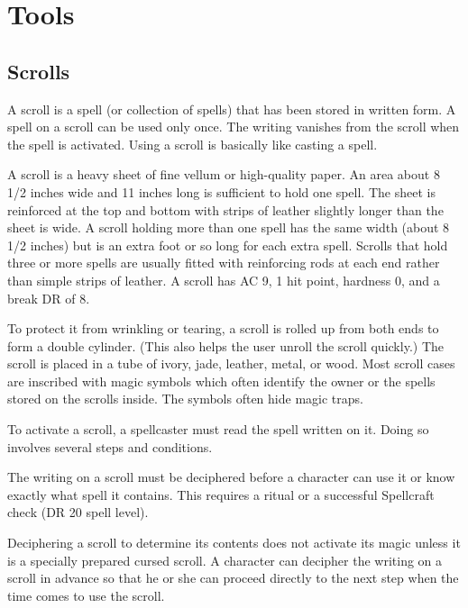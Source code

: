 \section{Tools}

    \subsection{Scrolls}
        A scroll is a spell (or collection of spells) that has been stored in written form.
        A spell on a scroll can be used only once.
        The writing vanishes from the scroll when the spell is activated.
        Using a scroll is basically like casting a spell.

         A scroll is a heavy sheet of fine vellum or high-quality paper.
        An area about 8 1/2 inches wide and 11 inches long is sufficient to hold one spell.
        The sheet is reinforced at the top and bottom with strips of leather slightly longer than the sheet is wide.
        A scroll holding more than one spell has the same width (about 8 1/2 inches) but is an extra foot or so long for each extra spell.
        Scrolls that hold three or more spells are usually fitted with reinforcing rods at each end rather than simple strips of leather.
        A scroll has AC 9, 1 hit point, hardness 0, and a break DR of 8.

        To protect it from wrinkling or tearing, a scroll is rolled up from both ends to form a double cylinder.
        (This also helps the user unroll the scroll quickly.) The scroll is placed in a tube of ivory, jade, leather, metal, or wood.
        Most scroll cases are inscribed with magic symbols which often identify the owner or the spells stored on the scrolls inside.
        The symbols often hide magic traps.

         To activate a scroll, a spellcaster must read the spell written on it.
        Doing so involves several steps and conditions.

         The writing on a scroll must be deciphered before a character can use it or know exactly what spell it contains.
        This requires a  ritual or a successful Spellcraft check (DR 20 \add spell level).

        Deciphering a scroll to determine its contents does not activate its magic unless it is a specially prepared cursed scroll.
        A character can decipher the writing on a scroll in advance so that he or she can proceed directly to the next step when the time comes to use the scroll.

